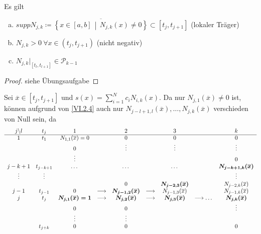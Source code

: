\begin{Kore}
  Es gilt
\begin{enumerate}[a)]
  \item $supp N_{j,k} \coloneqq 
    \overline{\left\{ x\in[a,b]\,\middle\vert
        \, N_{j,k}(x)\neq 0\right\}} \subset [t_j, t_{j+1}]$
    (lokaler Träger)
  \item $N_{j,k}>0 ~\forall x\in(t_j,t_{j+1})$ (nicht negativ)
  \item $N_{j,k}\vert_{[t_l,t_{l+1}]}\in \mathcal{P}_{k-1}$
\end{enumerate}

\begin{proof}
  siehe Übungsaufgabe
\end{proof}
\end{Kore}

\label{6.2.8}
Sei $\overline{x}\in[t_j,t_{j+1}]$ und
 $s(x) = \sum_{i=1}^{N}c_iN_{i,k}(x)$.
Da nur $N_{j,1}(\overline{x})\neq 0$ ist, 
können aufgrund von \eqref{VI.2.4}
auch nur $N_{j-l+1, l}(\overline{x}), \dots, N_{j,k}(\overline{x})$
verschieden von Null sein, da
\begin{align*}
\begin{array}{ccccccccc}
  j\backslash l & t_j & 1 && 2 && 3 &&k\\
  \cline{1-9}
  1 & t_1 & N_{1,1}(\overline{x})=0 &&0&&0&&0\\
  &&0&&\vdots&&\vdots&&\vdots\\
  &&\vdots &&&&&&0\\
  j-k+1&t_{j-k+1} &\dots &&\dots&&\dots&&\boldsymbol{N_{j-k+1,k}(\overline{x})} \\
  \vdots&\vdots&&&&&&&\vdots\\
   && &&0&& \boldsymbol{N_{j-2,3}(\overline{x})}
                               &&N_{j-2,k}(\overline{x})\\
  j-1 & t_{j-1} &0 &\longrightarrow & \boldsymbol{N_{j-1,2}(\overline{x})}
                          &\longrightarrow & N_{j-1,3}(\overline{x})
                          && N_{j-1,k}(\overline{x})\\
  j& t_j & \boldsymbol{N_{j,1}(\overline{x})=1}&\longrightarrow&\boldsymbol{N_{j,2}(\overline{x})}
    &\longrightarrow&\boldsymbol{N_{j,3}(\overline{x})}&\longrightarrow\dots&\boldsymbol{N_{j,k}(\overline{x})}\\
  &&0&&0&&&&\vdots\\
  &&\vdots &&\vdots\\
  &t_{j+k}&0&&0&&&&0
\end{array}
\end{align*}

